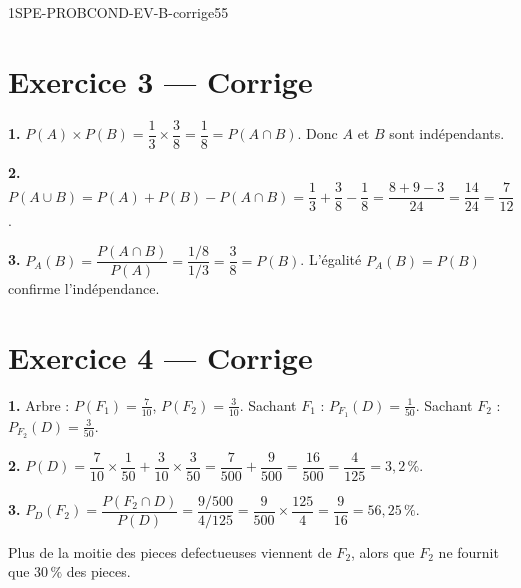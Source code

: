 \begin{evaluation}{1SPE-PROBCOND-EV-B-corrige}{55}
\section*{Exercice 3 --- Corrige}


\textbf{1.} $P(A) \times P(B) = \dfrac{1}{3} \times \dfrac{3}{8} = \dfrac{1}{8} = P(A \cap B)$. Donc $A$ et $B$ sont indépendants.

\medskip
\textbf{2.} $P(A \cup B) = P(A) + P(B) - P(A \cap B) = \dfrac{1}{3} + \dfrac{3}{8} - \dfrac{1}{8} = \dfrac{8+9-3}{24} = \dfrac{14}{24} = \dfrac{7}{12}$.

\medskip
\textbf{3.} $P_A(B) = \dfrac{P(A \cap B)}{P(A)} = \dfrac{1/8}{1/3} = \dfrac{3}{8} = P(B)$. L'égalité $P_A(B) = P(B)$ confirme l'indépendance.

\section*{Exercice 4 --- Corrige}


\textbf{1.} Arbre : $P(F_1) = \frac{7}{10}$, $P(F_2) = \frac{3}{10}$. Sachant $F_1$ : $P_{F_1}(D) = \frac{1}{50}$. Sachant $F_2$ : $P_{F_2}(D) = \frac{3}{50}$.

\medskip
\textbf{2.} $P(D) = \dfrac{7}{10} \times \dfrac{1}{50} + \dfrac{3}{10} \times \dfrac{3}{50} = \dfrac{7}{500} + \dfrac{9}{500} = \dfrac{16}{500} = \dfrac{4}{125} = 3{,}2\,\%$.

\medskip
\textbf{3.} $P_D(F_2) = \dfrac{P(F_2 \cap D)}{P(D)} = \dfrac{9/500}{4/125} = \dfrac{9}{500} \times \dfrac{125}{4} = \dfrac{9}{16} = 56{,}25\,\%$.

Plus de la moitie des pieces defectueuses viennent de $F_2$, alors que $F_2$ ne fournit que $30\,\%$ des pieces.

\end{evaluation}
